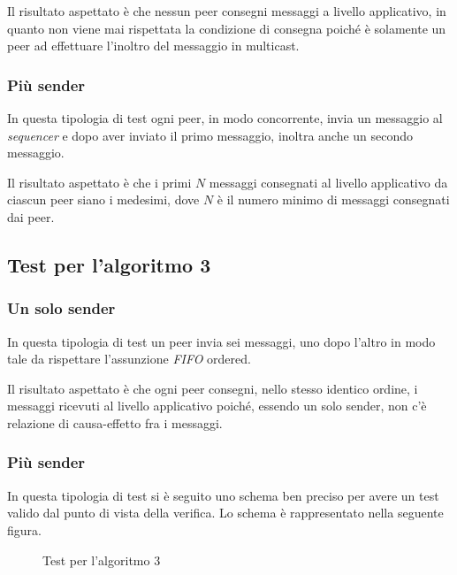 \documentclass[acmtog]{acmart}
\begin{document}
Il risultato aspettato è che nessun peer consegni messaggi a livello applicativo, in quanto non viene mai rispettata la condizione di consegna poiché è solamente un peer ad effettuare l'inoltro del messaggio in multicast.

\subsubsection{Più sender} In questa tipologia di test ogni peer, in modo concorrente, invia un messaggio al \textit{sequencer} e dopo aver inviato il primo messaggio, inoltra anche un secondo messaggio. 

Il risultato aspettato è che i primi $N$ messaggi consegnati al livello applicativo da ciascun peer siano i medesimi, dove $N$ è il numero minimo di messaggi consegnati dai peer.
\subsection{Test per l'algoritmo 3}
\subsubsection{Un solo sender} In questa tipologia di test un peer invia sei messaggi, uno dopo l'altro in modo tale da rispettare l'assunzione \textit{FIFO} ordered.

Il risultato aspettato è che ogni peer consegni, nello stesso identico ordine, i messaggi ricevuti al livello applicativo poiché, essendo un solo sender, non c'è relazione di causa-effetto fra i messaggi.

\subsubsection{Più sender} In questa tipologia di test si è seguito uno schema ben preciso per avere un test valido dal punto di vista della verifica. Lo schema è rappresentato nella seguente figura.

\begin{figure}[ht!]
\centering
{}
\caption{Test per l'algoritmo 3}
\end{figure}
\end{document}
